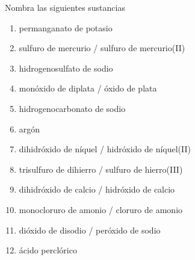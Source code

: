 \documentclass[10pt,a5paper,twoside]{article}
\begin{document}
\begin{exercise}[
    tags    = {inorgánica,nomenclatura,múltiple,2B},
    topics  = {química inorgánica,formulación,nomenclatura},
    source  = {Química 2B SAN 2016, p372, e7},
  ]
  Nombra las siguientes sustancias

  \begin{enumerate}\begin{multicols}{2}
    \item {}
    \item {}
    \item {}
    \item {}
    \item {}
    \item {}
    \item {}
    \item {}
    \item {}
    \item {}
    \item {}
    \item {}
  \end{multicols}\end{enumerate}
\end{exercise}

\begin{solution}
  \begin{enumerate}
    \item permanganato de potasio
    \item sulfuro de mercurio / sulfuro de mercurio(II)
    \item hidrogenosulfato de sodio
    \item monóxido de diplata / óxido de plata
    \item hidrogenocarbonato de sodio
    \item argón
    \item dihidróxido de níquel / hidróxido de níquel(II)
    \item trisulfuro de dihierro / sulfuro de hierro(III)
    \item dihidróxido de calcio / hidróxido de calcio
    \item monocloruro de amonio / cloruro de amonio
    \item dióxido de disodio / peróxido de sodio
    \item ácido perclórico
  \end{enumerate}
\end{solution}
\end{document}
